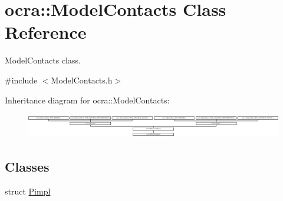 \hypertarget{classocra_1_1ModelContacts}{}\section{ocra\+:\+:Model\+Contacts Class Reference}
\label{classocra_1_1ModelContacts}


Model\+Contacts class.  




{\ttfamily \#include $<$Model\+Contacts.\+h$>$}

Inheritance diagram for ocra\+:\+:Model\+Contacts\+:\begin{figure}[H]
\begin{center}
\leavevmode
\includegraphics[height=1.082126cm]{d8/d4c/classocra_1_1ModelContacts}
\end{center}
\end{figure}
\subsection*{Classes}
\begin{DoxyCompactItemize}
\item 
struct \hyperlink{structocra_1_1ModelContacts_1_1Pimpl}{Pimpl}
\end{DoxyCompactItemize}

